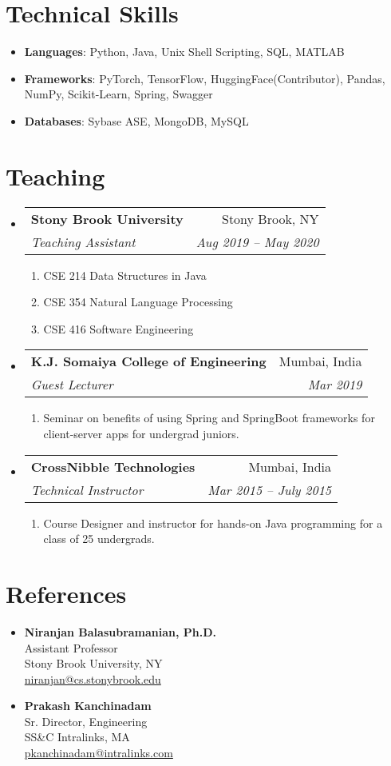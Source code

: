 \documentclass[letterpaper,11pt]{article}
\makeatletter
\newcommand{\resumeItem}[2]{
  \item\small{
    \textbf{#1}{: #2 \vspace{-2pt}}
  }
}
\newcommand{\resumeItemNoColon}[2]{
  \item\small{
    \textbf{#1}{ #2 \vspace{-2pt}}
  }
}
\newcommand{\resumeSubheading}[4]{
  \vspace{-1pt}\item
    \begin{tabular*}{0.97\textwidth}{l@{\extracolsep{\fill}}r}
      \textbf{#1} & #2 \\
      \textit{\small#3} & \textit{\small #4} \\
    \end{tabular*}\vspace{-5pt}
}
\newcommand{\resumeSubItem}[2]{\resumeItem{#1}{#2}\vspace{-4pt}}
\newcommand{\resumeSubItemNoColon}[2]{\resumeItemNoColon{#1}{#2}\vspace{-4pt}}
\newcommand{\resumeSubHeadingListStart}{\begin{itemize}[leftmargin=*]}
\newcommand{\resumeSubHeadingListEnd}{\end{itemize}}
\def\faGears{\unichar{"F085}}
\def\faClipboard{\unichar{"F0EA}}
\makeatother
\begin{document}
\section{{\faGears} Technical Skills}
 \resumeSubHeadingListStart
 \resumeSubItem{Languages}{Python, Java, Unix Shell Scripting, SQL, MATLAB}
 \resumeSubItem{Frameworks}{PyTorch, TensorFlow, HuggingFace(Contributor), Pandas, NumPy, Scikit-Learn, Spring, Swagger}
 \resumeSubItem{Databases}{Sybase ASE, MongoDB, MySQL}
 \resumeSubHeadingListEnd
 
 
\section{{\faClipboard} Teaching}
 \resumeSubHeadingListStart
    \resumeSubheading
      {Stony Brook University}{Stony Brook, NY}
      {Teaching Assistant}{Aug 2019 -- May 2020}
\begin{enumerate}[label={}, labelsep=0pt, leftmargin=0pt]
    \item CSE 214 Data Structures in Java
    \item CSE 354 Natural Language Processing
    \item CSE 416 Software Engineering
\end{enumerate}
      
\resumeSubheading
      {K.J. Somaiya College of Engineering}{Mumbai, India}
      {Guest Lecturer}{Mar 2019}
\begin{enumerate}[label={}, labelsep=0pt, leftmargin=0pt]
    \item Seminar on benefits of using Spring and SpringBoot frameworks for client-server apps for undergrad juniors.
\end{enumerate}

\resumeSubheading
      {CrossNibble Technologies}{Mumbai, India}
      {Technical Instructor}{Mar 2015 -- July 2015}
      
\begin{enumerate}[label={}, labelsep=0pt, leftmargin=0pt]
    \item Course Designer and instructor for hands-on Java programming for a class of 25 undergrads.
\end{enumerate}

\resumeSubHeadingListEnd

\section{{\faCommentsO} References}
\resumeSubHeadingListStart
 \resumeSubItemNoColon
      {Niranjan Balasubramanian, Ph.D.}{\\Assistant Professor\\Stony Brook University, NY\\\href{mailto:niranjan@cs.stonybrook.edu}{niranjan@cs.stonybrook.edu}}
 \resumeSubItemNoColon
      {Prakash Kanchinadam}{\\Sr. Director, Engineering\\SS\&C Intralinks, MA\\\href{mailto:pkanchinadam@intralinks.com}{pkanchinadam@intralinks.com}}
\resumeSubHeadingListEnd
\end{document}
